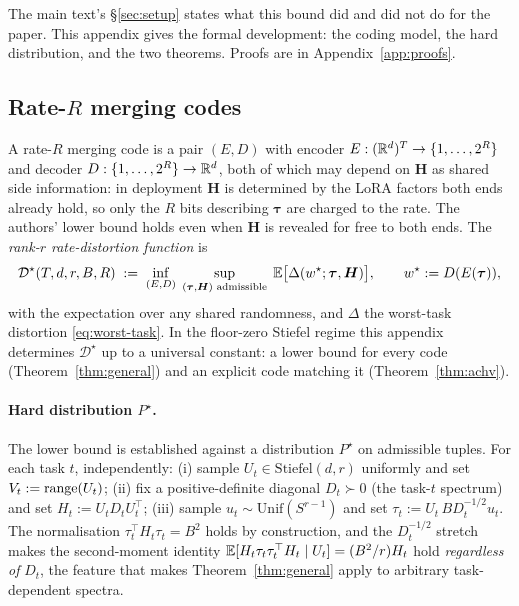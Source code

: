 The main text's \S\ref{sec:setup} states what this bound did and did not do
for the paper. This appendix gives the formal development: the coding model,
the hard distribution, and the two theorems. Proofs are in
Appendix~\ref{app:proofs}.

\subsection{Rate-\texorpdfstring{$R$}{R} merging codes}
\label{app:rd-codes}

A rate-$R$ merging code is a pair $(E, D)$ with encoder
$E : (\mathbb{R}^d)^T \to \{1,\ldots,2^R\}$ and decoder
$D : \{1,\ldots,2^R\} \to \mathbb{R}^d$, both of which may depend on
$\boldsymbol H$ as shared side information: in deployment $\boldsymbol H$ is
determined by the LoRA factors both ends already hold, so only the $R$ bits
describing $\boldsymbol\tau$ are charged to the rate. The authors' lower bound holds
even when $\boldsymbol H$ is revealed for free to both ends. The
\emph{rank-$r$ rate-distortion function} is
\begin{equation}\label{eq:rd-def}
  \mathcal{D}^\star(T, d, r, B, R)
  \;:=\; \inf_{(E, D)}\;\sup_{(\boldsymbol\tau, \boldsymbol H)
    \text{ admissible}}\;
  \mathbb{E}\bigl[\Delta(w^\star;\boldsymbol\tau, \boldsymbol H)\bigr],
  \qquad w^\star := D(E(\boldsymbol\tau)),
\end{equation}
with the expectation over any shared randomness, and $\Delta$ the worst-task
distortion \eqref{eq:worst-task}. In the floor-zero Stiefel regime this
appendix determines $\mathcal{D}^\star$ up to a universal constant: a lower
bound for every code (Theorem~\ref{thm:general}) and an explicit code matching
it (Theorem~\ref{thm:achv}).

\paragraph{Hard distribution $P^\star$.} The lower bound is established
against a distribution $P^\star$ on admissible tuples. For each task
$t$, independently: (i) sample $U_t \in \mathrm{Stiefel}(d, r)$
uniformly and set $V_t := \operatorname{range}(U_t)$; (ii) fix a positive-definite
diagonal $D_t \succ 0$ (the task-$t$ spectrum) and set $H_t := U_t D_t
U_t^\top$; (iii) sample $u_t \sim \mathrm{Unif}(S^{r-1})$ and set
$\tau_t := U_t\, B D_t^{-1/2} u_t$. The normalisation
$\tau_t^\top H_t \tau_t = B^2$ holds by construction, and the
$D_t^{-1/2}$ stretch makes the second-moment identity
$\mathbb{E}[H_t \tau_t \tau_t^\top H_t \mid U_t] = (B^2/r) H_t$ hold
\emph{regardless of} $D_t$, the feature that makes
Theorem~\ref{thm:general} apply to arbitrary task-dependent spectra.

